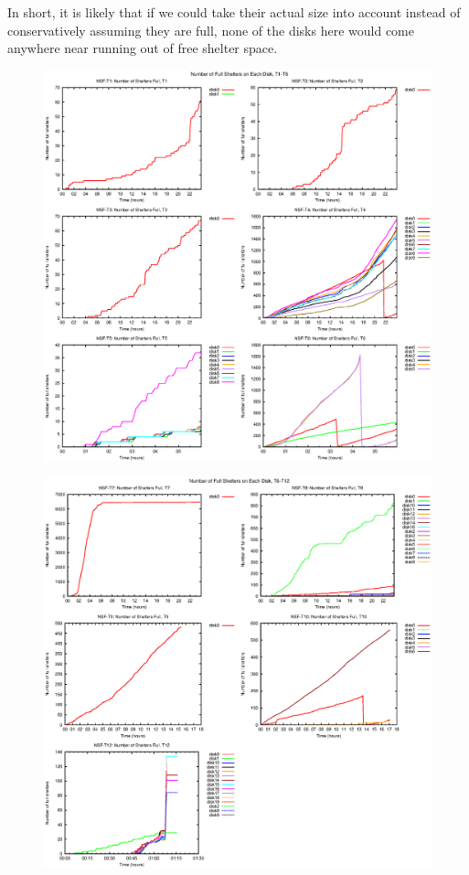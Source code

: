 \documentclass[10pt]{article}
\begin{document}
In short, it is likely that if we could take their actual size into account
instead of conservatively assuming they are full,
none of the disks here would come anywhere near running out of free shelter space.

\begin{figure}
\includegraphics[scale=2, width=\textwidth]{full_shelt_cnt1.eps}
\end{figure}

\begin{figure}
\includegraphics[scale=2, width=\textwidth]{full_shelt_cnt2.eps}
\end{figure}
\end{document}
